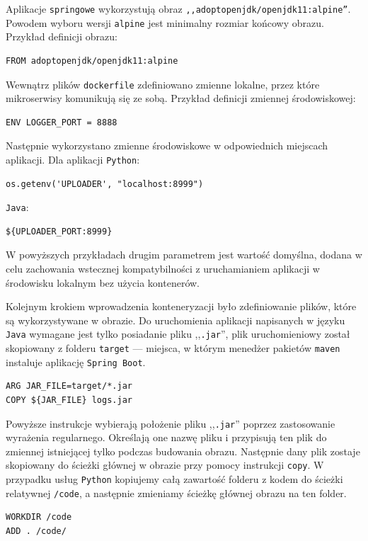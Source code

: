 \documentclass[12pt,twoside]{article}
\begin{document}
Aplikacje \texttt{springowe} wykorzystują obraz \texttt{,,adoptopenjdk/openjdk11:alpine''}. Powodem wyboru wersji \texttt{alpine} jest minimalny rozmiar końcowy obrazu. Przykład definicji obrazu:
\begin{lstlisting}[breaklines]
FROM adoptopenjdk/openjdk11:alpine
\end{lstlisting}
Wewnątrz plików \texttt{dockerfile} zdefiniowano zmienne lokalne, przez które mikroserwisy komunikują się ze sobą. Przykład definicji zmiennej środowiskowej:
\begin{lstlisting}
ENV LOGGER_PORT = 8888
\end{lstlisting}
Następnie wykorzystano zmienne środowiskowe w odpowiednich miejscach aplikacji. Dla aplikacji \texttt{Python}:
\begin{lstlisting}
os.getenv('UPLOADER', "localhost:8999")
\end{lstlisting}
\texttt{Java}:
\begin{lstlisting}
${UPLOADER_PORT:8999}
\end{lstlisting}
W powyższych przykładach drugim parametrem jest wartość domyślna, dodana w celu zachowania wstecznej kompatybilności z uruchamianiem aplikacji w środowisku lokalnym bez użycia kontenerów.

Kolejnym krokiem wprowadzenia konteneryzacji było zdefiniowanie plików, które są wykorzystywane w obrazie. Do uruchomienia aplikacji napisanych w języku \texttt{Java} wymagane jest tylko posiadanie pliku ,,\texttt{.jar}'', plik uruchomieniowy został skopiowany z folderu \texttt{target} — miejsca, w którym menedżer pakietów \texttt{maven} instaluje aplikację \texttt{Spring Boot}.
\begin{lstlisting}
ARG JAR_FILE=target/*.jar
COPY ${JAR_FILE} logs.jar
\end{lstlisting}
Powyższe instrukcje wybierają położenie pliku ,,\texttt{.jar}'' poprzez zastosowanie wyrażenia regularnego. Określają one nazwę pliku i przypisują ten plik do zmiennej istniejącej tylko podczas budowania obrazu. Następnie dany plik zostaje skopiowany do ścieżki głównej w obrazie przy pomocy instrukcji \texttt{copy}. W przypadku usług \texttt{Python} kopiujemy całą zawartość folderu z kodem do ścieżki relatywnej \texttt{/code}, a następnie zmieniamy ścieżkę głównej obrazu na ten folder.

\begin{lstlisting}
WORKDIR /code
ADD . /code/ 
\end{lstlisting}
\end{document}
